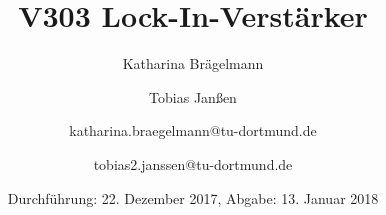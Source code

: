 
\title{V303 Lock-In-Verstärker}
\author{Katharina Brägelmann \and Tobias Janßen \and katharina.braegelmann@tu-dortmund.de \and tobias2.janssen@tu-dortmund.de}
\date{Durchführung: 22. Dezember 2017, Abgabe: 13. Januar 2018}
\maketitle

\tableofcontents
